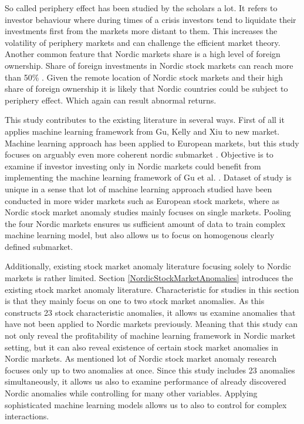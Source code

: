 \documentclass{article}
\begin{document}
So called periphery effect has been studied by the scholars a lot. %
It refers to investor behaviour where during times of a crisis investors tend to liquidate their investments first from the markets more distant to them. This increases the volatility of periphery markets and can challenge the efficient market theory. Another common feature that Nordic markets share is a high level of foreign ownership. Share of foreign investments in Nordic stock markets can reach more than 50\% \footnotemark. Given the remote location of Nordic stock markets and their high share of foreign ownership it is likely that Nordic countries could be subject to periphery effect. Which again can result abnormal returns. \par

This study contributes to the existing literature in several ways. First of all it applies machine learning framework from Gu, Kelly and Xiu \citeyear{guetal} to new market. Machine learning approach has been applied to European markets, but this study focuses on arguably even more coherent nordic submarket \cite{Drobetz, Fieberg}. Objective is to examine if investor investing only in Nordic markets could benefit from implementing the machine learning framework of Gu et al. \citeyear{guetal}. Dataset of study is unique in a sense that lot of machine learning approach studied have been conducted in more wider markets such as European stock markets, where as Nordic stock market anomaly studies mainly focuses on single markets. Pooling the four Nordic markets ensures us sufficient amount of data to train complex machine learning model, but also allows us to focus on homogenous clearly defined submarket. \par

Additionally, existing stock market anomaly literature focusing solely to Nordic markets is rather limited. Section \ref{NordicStockMarketAnomalies} introduces the existing stock market anomaly literature. Characteristic for studies in this section is that they mainly focus on one to two stock market anomalies. As this constructs 23 stock characteristic anomalies, it allows us examine anomalies that have not been applied to Nordic markets previously. Meaning that this study can not only reveal the profitability of machine learning framework in Nordic market setting, but it can also reveal existence of certain stock market anomalies in Nordic markets. As mentioned lot of Nordic stock market anomaly research focuses only up to two anomalies at once. Since this study includes 23 anomalies simultaneously, it allows us also to examine performance of already discovered Nordic anomalies while controlling for many other variables. Applying sophisticated machine learning models allows us to also to control for complex interactions. \par
\end{document}
